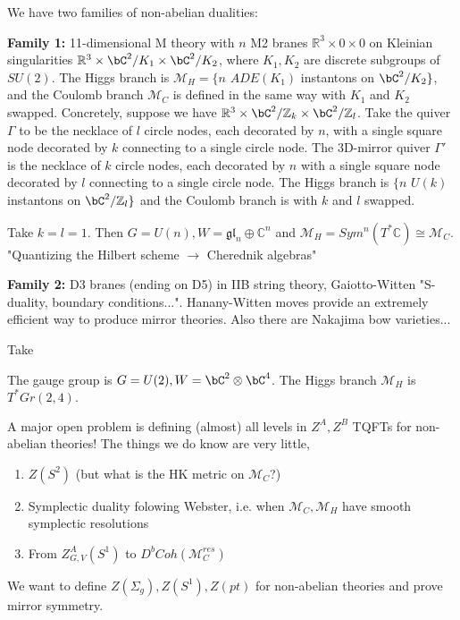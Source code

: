 We have two families of non-abelian dualities:

\textbf{Family 1:} 11-dimensional M theory with $n$ M2 branes $\mathbb{R}^3 \times 0 \times 0$ on Kleinian singularities $\mathbb{R}^3 \times \bC^2/K_1 \times \bC^2/K_2$, where $K_1, K_2$ are discrete subgroups of $SU(2)$. The Higgs branch is $\mathcal{M}_H = \{\textit{n }  ADE(K_1)$ instantons on $\bC^2/K_2\}$, and the Coulomb branch $\mathcal{M}_C$ is defined in the same way with $K_1$ and $K_2$ swapped. Concretely, suppose we have $\mathbb{R}^3 \times \bC^2/\mathbb{Z}_k \times \bC^2/\mathbb{Z}_l$. Take the quiver $\Gamma$ to be the necklace of $l$ circle nodes, each decorated by $n$, with a single square node decorated by $k$ connecting to a single circle node. The 3D-mirror quiver $\Gamma'$ is the necklace of $k$ circle nodes, each decorated by $n$ with a single square node decorated by $l$ connecting to a single circle node. The Higgs branch is $\{\textit{n } U(k) $ instantons on $\bC^2/\mathbb{Z}_l\}$ and the Coulomb branch is with $k$ and $l$ swapped.

Take $k=l=1$. Then $G = U(n), W = \mathfrak{gl}_n \oplus \mathbb{C}^n$ and $\mathcal{M}_H = Sym^n(T^*\mathbb{C}) \cong \mathcal{M}_C$. "Quantizing the Hilbert scheme $\rightarrow$ Cherednik algebras"

\textbf{Family 2:}  D3 branes (ending on D5) in IIB string theory, Gaiotto-Witten "S-duality, boundary conditions...". Hanany-Witten moves provide an extremely efficient way to produce mirror theories. Also there are Nakajima bow varieties...

\begin{example}
Take
The gauge group is $G = U(2), W = \bC^2 \otimes \bC^4$. The Higgs branch $\mathcal{M}_H$ is $T^*Gr(2,4).$
\end{example}

A major open problem is defining (almost) all levels in $Z^A, Z^B$ TQFTs for non-abelian theories! The things we do know are very little,
\begin{enumerate}
\item $Z(S^2)$ (but what is the HK metric on $\mathcal{M}_C$?)
\item Symplectic duality folowing Webster, i.e. when $\mathcal{M}_C, \mathcal{M}_H$ have smooth symplectic resolutions
\item From $Z^A_{G, V}(S^1)$ to $D^bCoh(\mathcal{M}_C^{res})$
\end{enumerate}
We want to define $Z(\Sigma_g), Z(S^1), Z(pt)$ for non-abelian theories and prove mirror symmetry.


